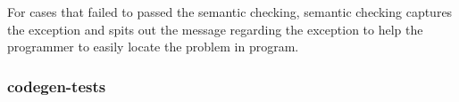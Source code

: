 For cases that failed to passed the semantic checking, 
semantic checking captures the exception and spits out the message regarding the exception 
to help the programmer to easily locate the problem in program.



\subsubsection{codegen-tests}
%



